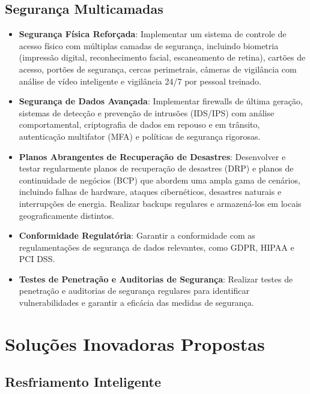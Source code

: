 \documentclass[
	12pt,				%
	oneside,			%
	a4paper,			%
	english,			%
	brazil				%
	]{abntex2unama}
\begin{document}
\section{Segurança Multicamadas}

\begin{itemize}
	\item \textbf{Segurança Física Reforçada}: Implementar um sistema de controle de acesso físico com múltiplas camadas de segurança, incluindo biometria (impressão digital, reconhecimento facial, escaneamento de retina), cartões de acesso, portões de segurança, cercas perimetrais, câmeras de vigilância com análise de vídeo inteligente e vigilância 24/7 por pessoal treinado.
	\item \textbf{Segurança de Dados Avançada}: Implementar firewalls de última geração, sistemas de detecção e prevenção de intrusões (IDS/IPS) com análise comportamental, criptografia de dados em repouso e em trânsito, autenticação multifator (MFA) e políticas de segurança rigorosas.
	\item \textbf{Planos Abrangentes de Recuperação de Desastres}: Desenvolver e testar regularmente planos de recuperação de desastres (DRP) e planos de continuidade de negócios (BCP) que abordem uma ampla gama de cenários, incluindo falhas de hardware, ataques cibernéticos, desastres naturais e interrupções de energia. Realizar backups regulares e armazená-los em locais geograficamente distintos.
	\item \textbf{Conformidade Regulatória}: Garantir a conformidade com as regulamentações de segurança de dados relevantes, como GDPR, HIPAA e PCI DSS.
	\item \textbf{Testes de Penetração e Auditorias de Segurança}: Realizar testes de penetração e auditorias de segurança regulares para identificar vulnerabilidades e garantir a eficácia das medidas de segurança.
\end{itemize}

\chapter{Soluções Inovadoras Propostas}

\section{Resfriamento Inteligente}
\end{document}
